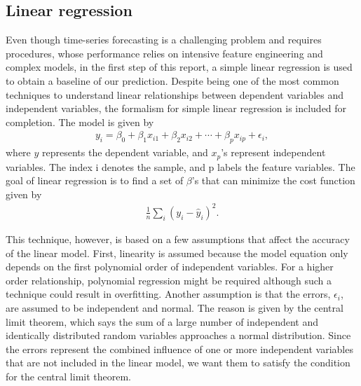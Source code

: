\documentclass[prl,aps,superscriptaddress,twocolumn,10pt,nolongbibliography]{revtex4-2}
\begin{document}
\subsection{Linear regression}
Even though time-series forecasting is a challenging problem and requires procedures, whose performance relies on intensive feature engineering and complex models, in the first step of this report, a simple linear regression is used to obtain a baseline of our prediction. 
Despite being one of the most common techniques to understand linear relationships between dependent variables and independent variables, the formalism for simple linear regression is included for completion. 
The model is given by 
\begin{align}
y_i = \beta_0 + \beta_1 x_{i1} + \beta_2 x_{i2} + \cdots + \beta_p x_{ip} + \epsilon_i, 
\end{align}
where $y$ represents the dependent variable, and $x_p$'s represent independent variables. 
The index i denotes the sample, and p labels the feature variables. The goal of linear regression is to find a set of $\beta$'s that can minimize the cost function given by 
\begin{align}
\frac{1}{n} \sum_i (y_{i} - \hat{y}_{i})^2.
\end{align}

This technique, however, is based on a few assumptions that affect the accuracy of the linear model. 
First, linearity is assumed because the model equation only depends on the first polynomial order of independent variables. 
For a higher order relationship, polynomial regression might be required although such a technique could result in overfitting. 
Another assumption is that the errors, $\epsilon_i$, are assumed to be independent and normal. 
The reason is given by the central limit theorem, which says the sum of a large number of independent and identically distributed random variables approaches a normal distribution. 
Since the errors represent the combined influence of one or more independent variables that are not included in the linear model, we want them to satisfy the condition for the central limit theorem. 
\end{document}

